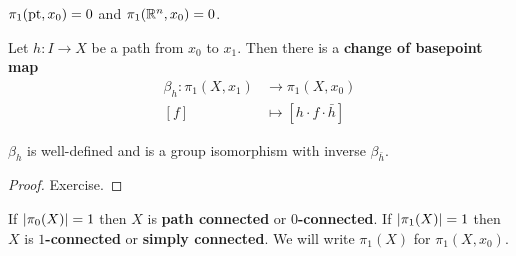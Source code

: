 \begin{exam}
	$\pi_1(\operatorname{pt},x_0)=0$ and $\pi_1(\mathbb{R}^n,x_0)=0$.
\end{exam}

\begin{defn}
	Let $h:I \to X$ be a path from $x_0$ to $x_1$.
	Then there is a \textbf{change of basepoint map}
	\begin{align*}
		\beta_h: \pi_1(X,x_1) &\to \pi_1(X,x_0) \\
		[f] &\mapsto [h \cdot f \cdot \bar{h}]
	\end{align*}
\end{defn}

\begin{prop}
	$\beta_h$ is well-defined and is a group isomorphism with inverse $\beta_{\bar{h}}$.
\end{prop}

\begin{proof}
	Exercise.
\end{proof}

\begin{rmk}
	If $\left\lvert \pi_0(X) \right\rvert=1$ then $X$ is \textbf{path connected} or \textbf{$0$-connected}.
	If $\left\lvert \pi_1(X) \right\rvert=1$ then $X$ is \textbf{$1$-connected} or \textbf{simply connected}.
	We will write $\pi_1(X)$ for $\pi_1(X,x_0)$.
\end{rmk}